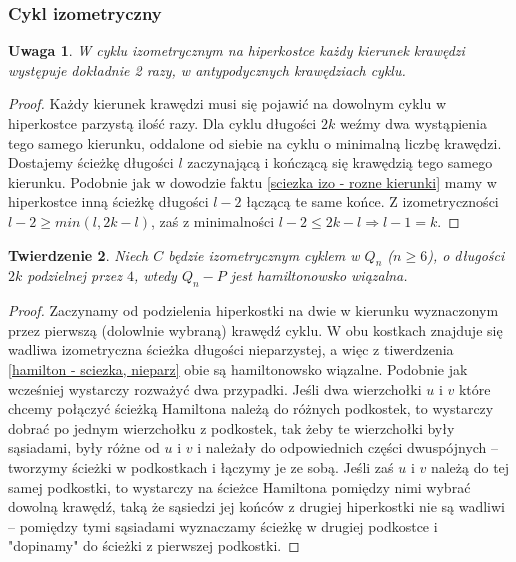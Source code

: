 \documentclass{pracamgr}
\newtheorem{theorem}{Twierdzenie}
\newtheorem{remark}[theorem]{Uwaga}
\begin{document}
    \subsubsection{Cykl izometryczny}
     \begin{remark}\label{cykl izometryczny - drugie pol powtorka}
      W cyklu izometrycznym na hiperkostce każdy kierunek krawędzi występuje dokładnie 2 razy, w antypodycznych krawędziach cyklu.
     \end{remark}
     \begin{proof}
      Każdy kierunek krawędzi musi się pojawić na dowolnym cyklu w hiperkostce parzystą ilość razy. Dla cyklu długości $2k$
      weźmy dwa wystąpienia tego samego kierunku, oddalone od siebie na cyklu o minimalną liczbę krawędzi. Dostajemy ścieżkę długości $l$ zaczynającą
      i kończącą się krawędzią tego samego kierunku. Podobnie jak w dowodzie faktu \ref{sciezka izo - rozne kierunki} mamy w hiperkostce
      inną ścieżkę długości $l-2$ łączącą te same końce. Z izometryczności $l-2\ge min(l,2k-l)$, zaś z minimalności $l-2\le 2k-l\Rightarrow l-1=k$.
     \end{proof}
     \begin{theorem}\label{hamilton - cykl, parz}
      Niech $C$ będzie izometrycznym cyklem w $Q_n$ ($n\ge6$), o długości $2k$ podzielnej przez $4$, wtedy $Q_n-P$ jest hamiltonowsko wiązalna.
     \end{theorem}
     \begin{proof}
      Zaczynamy od podzielenia hiperkostki na dwie w kierunku wyznaczonym przez pierwszą (dolowlnie wybraną) krawędź cyklu.
      W obu kostkach znajduje się wadliwa izometryczna ścieżka długości nieparzystej, a więc z tiwerdzenia \ref{hamilton - sciezka, nieparz}
      obie są hamiltonowsko wiązalne. Podobnie jak wcześniej wystarczy rozważyć dwa przypadki. Jeśli dwa wierzchołki $u$ i $v$
      które chcemy połączyć ścieżką Hamiltona należą do różnych podkostek,
      to wystarczy dobrać po jednym wierzchołku z podkostek, tak żeby te wierzchołki były sąsiadami, były różne od $u$ i $v$ i należały do odpowiednich
      części dwuspójnych -- tworzymy ścieżki w podkostkach i łączymy je ze sobą. Jeśli zaś $u$ i $v$ należą do tej samej podkostki,
      to wystarczy na ścieżce Hamiltona pomiędzy nimi wybrać dowolną krawędź, taką że sąsiedzi jej końców z drugiej hiperkostki nie są wadliwi --
      pomiędzy tymi sąsiadami wyznaczamy ścieżkę w drugiej podkostce i "dopinamy" do ścieżki z pierwszej podkostki.
     \end{proof}
\end{document}
